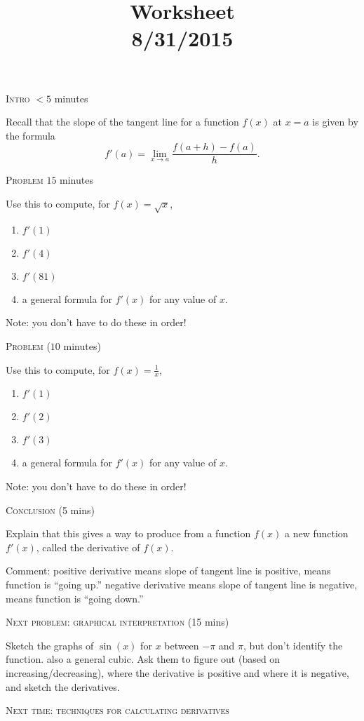 \documentclass[12pt]{amsart}
\title{Worksheet \\8/31/2015}
\begin{document}
\maketitle

\bigskip
\textsc{Intro} $< 5$ minutes

Recall that the slope of the tangent line for a function $f(x)$ at $x = a$
is given by the formula
$$f'(a) = \lim_{x \to a} \frac{f(a + h) - f(a)}{h}.$$

\bigskip
\textsc{Problem} $15$ minutes

Use this to compute, for $f(x) = \sqrt x$,
\begin{enumerate}[1. ] 
\item $f'(1)$
\item $f'(4)$
\item $f'(81)$
\item a general formula for $f'(x)$ for any value of $x$.
\end{enumerate}

Note: you don't have to do these in order!

\bigskip
\textsc{Problem} ($10$ minutes)

Use this to compute, for $f(x) = \frac 1x$,
\begin{enumerate}[1. ] 
\item $f'(1)$
\item $f'(2)$
\item $f'(3)$
\item a general formula for $f'(x)$ for any value of $x$.
\end{enumerate}

Note: you don't have to do these in order!

\bigskip
\textsc{Conclusion} (5 mins)

Explain that this gives a way to produce from a function $f(x)$ a new
function $f'(x)$, called the derivative of $f(x)$.

Comment: positive derivative means slope of tangent line is positive, means
function is ``going up.'' negative derivative means slope of tangent line
is negative, means function is ``going down.''

\bigskip
\textsc{Next problem: graphical interpretation} (15 mins)

Sketch the graphs of $\sin(x)$ for $x$ between $-\pi$ and $\pi$, but don't
identify the function. also a general cubic. Ask them to
figure out (based on increasing/decreasing), where the derivative is
positive and where it is negative, and sketch the derivatives.

\vfill

\textsc{Next time: techniques for calculating derivatives}
\end{document}
